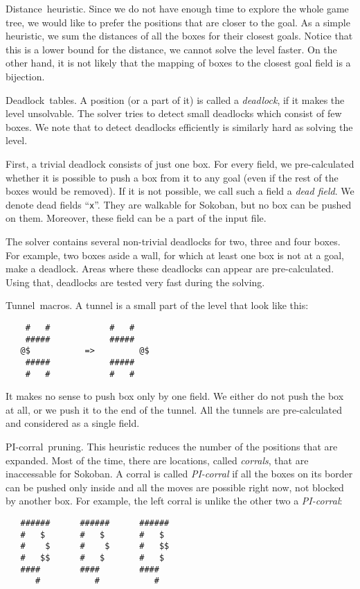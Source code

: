 \documentclass[twocolumn]{article}
\newcommand{\heading}[1]{\smallbreak\par\noindent\hbox{\mybf #1}}
\begin{document}
\heading{Distance heuristic.} Since we do not have enough time to explore the whole game tree, we would like to prefer the positions that are closer
to the goal. As a simple heuristic, we sum the distances of all the boxes for their closest goals. Notice that this is a lower bound for the
distance, we cannot solve the level faster. On the other hand, it is not likely that the mapping of boxes to the closest goal field is a bijection.

\heading{Deadlock tables.} A position (or a part of it) is called a \emph{deadlock}, if it makes the level unsolvable. The solver tries to detect
small deadlocks which consist of few boxes. We note that to detect deadlocks efficiently is similarly hard as solving the level.

First, a trivial deadlock consists of just one box. For every field, we pre-calculated whether it is possible to push a box from it to any goal (even
if the rest of the boxes would be removed). If it is not possible, we call such a field a \emph{dead field}. We denote dead fields ``{\tt x}''.
They are walkable for Sokoban, but no box can be pushed on them. Moreover, these field can be a part of the input file.

The solver contains several non-trivial deadlocks for two, three and four boxes. For example, two boxes aside a wall, for which at least one box is
not at a goal, make a deadlock. Areas where these deadlocks can appear are pre-calculated. Using that, deadlocks are tested very fast during the
solving.

\heading{Tunnel macros.} A tunnel is a small part of the level that look like this:
\begin{verbatim}
    #   #            #   #
    #####            #####
   @$	        =>         @$
    #####            #####
    #   #            #   #
\end{verbatim}
It makes no sense to push box only by one field. We either do not push the box at all, or we push it to the end of the tunnel. All the tunnels are
pre-calculated and considered as a single field.

\heading{PI-corral pruning.} This heuristic reduces the number of the positions that are expanded. Most of the time, there are locations, called
\emph{corrals}, that are inaccessable for Sokoban. A corral is called \emph{PI-corral} if all the boxes on its border can be pushed only inside and all the moves are
possible right now, not blocked by another box. For example, the left corral is unlike the other two a \emph{PI-corral}:
\begin{verbatim}
   ######      ######      ######
   #   $       #   $       #   $
   #    $      #    $      #   $$
   #   $$      #   $       #   $
   ####        ####        ####
      #           #           #
\end{verbatim}
\end{document}
